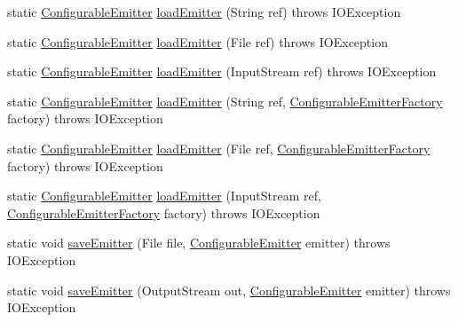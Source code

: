 \begin{DoxyCompactItemize}
\item 
static \mbox{\hyperlink{classorg_1_1newdawn_1_1slick_1_1particles_1_1_configurable_emitter}{Configurable\+Emitter}} \mbox{\hyperlink{classorg_1_1newdawn_1_1slick_1_1particles_1_1_particle_i_o_af2afc8b074ac941f5b987b1396747a0f}{load\+Emitter}} (String ref)  throws I\+O\+Exception 
\item 
static \mbox{\hyperlink{classorg_1_1newdawn_1_1slick_1_1particles_1_1_configurable_emitter}{Configurable\+Emitter}} \mbox{\hyperlink{classorg_1_1newdawn_1_1slick_1_1particles_1_1_particle_i_o_a4cc2ae308ef94ca524cda6af6f692550}{load\+Emitter}} (File ref)  throws I\+O\+Exception 
\item 
static \mbox{\hyperlink{classorg_1_1newdawn_1_1slick_1_1particles_1_1_configurable_emitter}{Configurable\+Emitter}} \mbox{\hyperlink{classorg_1_1newdawn_1_1slick_1_1particles_1_1_particle_i_o_a11b12fb004b65bf944237efd5f3159d4}{load\+Emitter}} (Input\+Stream ref)  throws I\+O\+Exception 
\item 
static \mbox{\hyperlink{classorg_1_1newdawn_1_1slick_1_1particles_1_1_configurable_emitter}{Configurable\+Emitter}} \mbox{\hyperlink{classorg_1_1newdawn_1_1slick_1_1particles_1_1_particle_i_o_af2675bd2501f0927d9053be7d58b0c6e}{load\+Emitter}} (String ref, \mbox{\hyperlink{interfaceorg_1_1newdawn_1_1slick_1_1particles_1_1_configurable_emitter_factory}{Configurable\+Emitter\+Factory}} factory)  throws I\+O\+Exception 
\item 
static \mbox{\hyperlink{classorg_1_1newdawn_1_1slick_1_1particles_1_1_configurable_emitter}{Configurable\+Emitter}} \mbox{\hyperlink{classorg_1_1newdawn_1_1slick_1_1particles_1_1_particle_i_o_a1179316ef36ea0ef0515190ec634f1fe}{load\+Emitter}} (File ref, \mbox{\hyperlink{interfaceorg_1_1newdawn_1_1slick_1_1particles_1_1_configurable_emitter_factory}{Configurable\+Emitter\+Factory}} factory)  throws I\+O\+Exception 
\item 
static \mbox{\hyperlink{classorg_1_1newdawn_1_1slick_1_1particles_1_1_configurable_emitter}{Configurable\+Emitter}} \mbox{\hyperlink{classorg_1_1newdawn_1_1slick_1_1particles_1_1_particle_i_o_a65b29e3f44f5cd5b19de29483351e225}{load\+Emitter}} (Input\+Stream ref, \mbox{\hyperlink{interfaceorg_1_1newdawn_1_1slick_1_1particles_1_1_configurable_emitter_factory}{Configurable\+Emitter\+Factory}} factory)  throws I\+O\+Exception 
\item 
static void \mbox{\hyperlink{classorg_1_1newdawn_1_1slick_1_1particles_1_1_particle_i_o_a38e0daafdd03fa48eb938576567fc4cc}{save\+Emitter}} (File file, \mbox{\hyperlink{classorg_1_1newdawn_1_1slick_1_1particles_1_1_configurable_emitter}{Configurable\+Emitter}} emitter)  throws I\+O\+Exception 
\item 
static void \mbox{\hyperlink{classorg_1_1newdawn_1_1slick_1_1particles_1_1_particle_i_o_ade7a5c9c444703fbbc463683aba9148a}{save\+Emitter}} (Output\+Stream out, \mbox{\hyperlink{classorg_1_1newdawn_1_1slick_1_1particles_1_1_configurable_emitter}{Configurable\+Emitter}} emitter)  throws I\+O\+Exception 
\end{DoxyCompactItemize}
